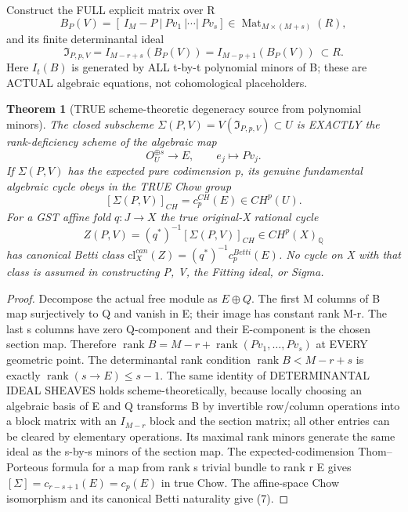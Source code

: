 \documentclass[11pt]{article}
\newtheorem{theorem}{Theorem}[section]
\begin{document}
Construct the FULL explicit
matrix over R
\[
 \boxed{
 B_P(V)=
 \left[
 \ I_M-P\ \Big|\
 Pv_1\ \Big|\cdots\Big|\
 Pv_s
 \right]\in
 \operatorname{Mat}_{M\times(M+s)}(R),
 }                                                     \tag{4}
\]
and its finite determinantal ideal
\[
 \boxed{
 \mathfrak I_{P,p,V}
 =I_{M-r+s}(B_P(V))
 =I_{M-p+1}(B_P(V))
       \ \subset R.
 }                                                     \tag{5}
\]
Here $I_t(B)$ is generated
by ALL t-by-t polynomial
minors of B; these are
ACTUAL algebraic equations,
not cohomological placeholders.

\begin{theorem}[TRUE scheme-theoretic degeneracy source from polynomial minors]
The closed subscheme
$\Sigma(P,V)=V(\mathfrak I_{P,p,V})
\subset U$ is EXACTLY
the rank-deficiency scheme
of the algebraic map
\[
  O_U^{\oplus s}\longrightarrow E,\qquad
           e_j\longmapsto Pv_j.
\]
If $\Sigma(P,V)$ has
the expected pure
codimension p, its genuine
fundamental algebraic cycle
obeys in the TRUE Chow group
\[
 \boxed{
 [\Sigma(P,V)]_{CH}
       =c_p^{CH}(E)\in CH^p(U).
 }                                                     \tag{6}
\]
For a GST affine fold
$q:J\to X$ the true
original-X rational cycle
\[
 \boxed{
 Z(P,V)=
  (q^*)^{-1}[\Sigma(P,V)]_{CH}
 \in CH^p(X)_\mathbb Q
 }                                                     \tag{7}
\]
has canonical Betti class
$\mathrm{cl}_X^{can}(Z)=
(q^*)^{-1}c_p^{Betti}(E)$.
No cycle on X with that class
is assumed in constructing P,
V, the Fitting ideal, or Sigma.
\end{theorem}
\begin{proof}
Decompose the actual free
module as $E\oplus Q$.
The first M columns of B
map surjectively to Q
and vanish in E; their
image has constant rank M-r.
The last s columns
have zero Q-component
and their E-component is
the chosen section map.
Therefore
$\operatorname{rank}B=
 M-r+\operatorname{rank}(Pv_1,\ldots,Pv_s)$
at EVERY geometric point.
The determinantal rank
condition $\operatorname{rank}B<
 M-r+s$ is exactly
$\operatorname{rank}(s\to E)\le s-1$.
The same identity of
DETERMINANTAL IDEAL SHEAVES
holds scheme-theoretically,
because locally choosing
an algebraic basis of E and Q
transforms B by invertible
row/column operations into
a block matrix with an
$I_{M-r}$ block and
the section matrix; all
other entries can be cleared
by elementary operations.
Its maximal rank minors
generate the same ideal
as the s-by-s minors of
the section map.
The expected-codimension
Thom--Porteous formula for
a map from rank s trivial
bundle to rank r E gives
$[\Sigma]=c_{r-s+1}(E)
=c_p(E)$ in true Chow.
The affine-space Chow
isomorphism and its
canonical Betti naturality
give (7).
\end{proof}
\end{document}
